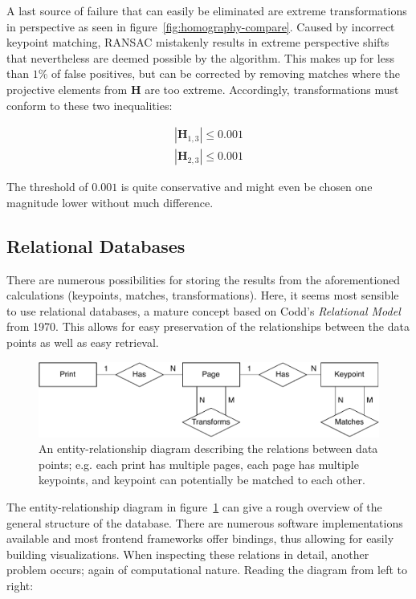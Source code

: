 \documentclass{ltjarticle}
\begin{document}
A last source of failure that can easily be eliminated are extreme transformations in perspective as seen in figure~\ref{fig:homography-compare}. Caused by incorrect keypoint matching, RANSAC mistakenly results in extreme perspective shifts that nevertheless are deemed possible by the algorithm. This makes up for less than $1\%$ of false positives, but can be corrected by removing matches where the projective elements from $\mathbf{H}$ are too extreme. Accordingly, transformations must conform to these two inequalities:

\begin{gather*}
    |\mathbf{H}_{1,3}| \leq 0.001\\
    |\mathbf{H}_{2,3}| \leq 0.001
\end{gather*}

The threshold of $0.001$ is quite conservative and might even be chosen one magnitude lower without much difference.

\subsection{Relational Databases}
\label{sec:relational-databases}

There are numerous possibilities for storing the results from the aforementioned calculations (keypoints, matches, transformations). Here, it seems most sensible to use relational databases, a mature concept based on Codd's \emph{Relational Model} from 1970.\cite{codd1970relational} This allows for easy preservation of the relationships between the data points as well as easy retrieval.

\begin{figure}
    \centering
    \includegraphics[width=\textwidth]{erschema.pdf}
    \caption[Entity-relationship diagram]{An entity-relationship diagram describing the relations between data points; e.g. each print has multiple pages, each page has multiple keypoints, and keypoint can potentially be matched to each other.}
    \label{fig:er-schema}
\end{figure}

The entity-relationship diagram in figure~\ref{fig:er-schema} can give a rough overview of the general structure of the database. There are numerous software implementations available and most frontend frameworks offer bindings, thus allowing for easily building visualizations. When inspecting these relations in detail, another problem occurs; again of computational nature. Reading the diagram from left to right:
\end{document}
